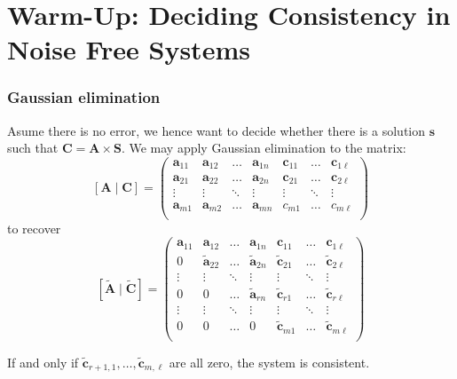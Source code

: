 \documentclass[10pt]{beamer}
\newcommand{\shortvec}[1]{\tilde{\mathbf{#1}}\xspace}
\renewcommand{\vec}[1]{\mathbf{#1}\xspace}
\begin{document}
\section{Warm-Up: Deciding Consistency in Noise Free Systems}

\begin{frame}
\frametitle{Gaussian elimination}
Asume there is no error, we hence want to decide whether there is a solution $\vec{s}$ such that $\vec{C} = \vec{A}\times \vec{S}$. We may apply Gaussian elimination to the matrix:
\[
\vec{[A\mid C]} = \left(\begin{array}{cccc|ccc}
\vec{a}_{11} & \vec{a}_{12} &  \dots & \vec{a}_{1n} & \vec{c}_{11} & \dots  & \vec{c}_{1\ell}\\
\vec{a}_{21} & \vec{a}_{22} &  \dots & \vec{a}_{2n} & \vec{c}_{21} & \dots  & \vec{c}_{2\ell}\\
\vdots       & \vdots       & \ddots & \vdots       & \vdots       & \ddots & \vdots\\
\vec{a}_{m1} & \vec{a}_{m2} & \dots  & \vec{a}_{mn} & c_{m1}       & \dots  & c_{m\ell}\\
\end{array}\right)
\]
to recover
\[
\vec{[\tilde A\mid \tilde C]} = \left(\begin{array}{cccc|ccc}
\vec{a}_{11} &      \vec{a}_{12} &  \dots & \vec{a}_{1n}      &      \vec{c}_{11} &  \dots &      \vec{c}_{1\ell}\\
           0 & \shortvec{a}_{22} &  \dots & \shortvec{a}_{2n} & \shortvec{c}_{21} &  \dots & \shortvec{c}_{2\ell}\\
      \vdots & \vdots            & \ddots & \vdots            & \vdots            & \ddots & \vdots \\
           0 & 0                 &  \dots & \shortvec{a}_{rn} & \shortvec{c}_{r1} &  \dots & \shortvec{c}_{r\ell}\\
      \vdots & \vdots            & \ddots & \vdots            & \vdots            & \ddots & \vdots \\
           0 & 0                 &  \dots & 0                 & \shortvec{c}_{m1} &  \dots & \shortvec{c}_{m\ell}\\
\end{array}\right)
\]

If and only if $\shortvec{c}_{r+1,1},\dots,\shortvec{c}_{m,\ell}$ are all zero, the system is consistent.

\framebreak

\vspace{-1.3em}
\begin{center}\end{center}


\end{frame}
\end{document}
